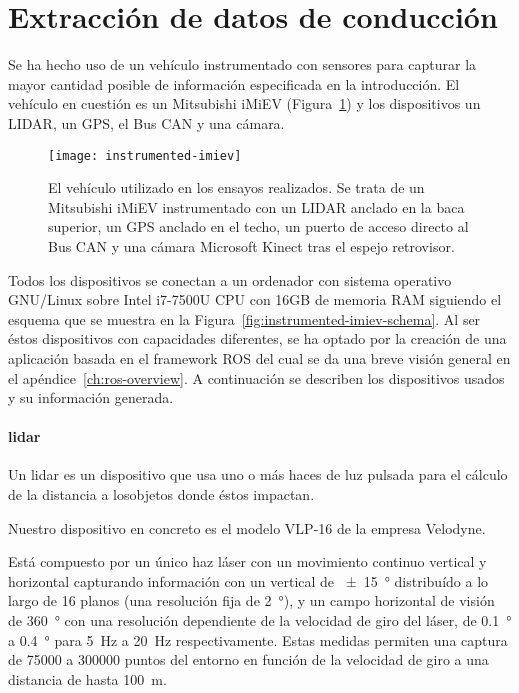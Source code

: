 \section{Extracción de datos de conducción}

Se ha hecho uso de un vehículo instrumentado con sensores para capturar la mayor cantidad posible de información especificada en la introducción. El vehículo en cuestión es un Mitsubishi iMiEV (Figura~\ref{fig:instrumented-imiev}) y los dispositivos un LIDAR, un GPS, el Bus CAN y una cámara.

\begin{figure}
	\texttt{[image: instrumented-imiev]}
	\caption{El vehículo utilizado en los ensayos realizados. Se trata de un Mitsubishi iMiEV instrumentado con un LIDAR anclado en la baca superior, un GPS anclado en el techo, un puerto de acceso directo al Bus CAN y una cámara Microsoft Kinect tras el espejo retrovisor.}
	\label{fig:instrumented-imiev}
\end{figure}

Todos los dispositivos se conectan a un ordenador con sistema operativo GNU/Linux sobre Intel i7-7500U CPU con 16GB de memoria RAM siguiendo el esquema que se muestra en la Figura~\ref{fig:instrumented-imiev-schema}. Al ser éstos dispositivos con capacidades diferentes, se ha optado por la creación de una aplicación basada en el framework ROS del cual se da una breve visión general en el apéndice~\ref{ch:ros-overview}. A continuación se describen los dispositivos usados y su información generada.

\paragraph{\ac{lidar}}

Un \ac{lidar} es un dispositivo que usa uno o más haces de luz pulsada para el cálculo de la distancia a losobjetos donde éstos impactan.

Nuestro dispositivo en concreto es el modelo VLP-16 de la empresa Velodyne.

Está compuesto por un único haz láser con un movimiento continuo vertical y horizontal capturando información con un vertical de \SI{\pm15}{\degree} distribuído a lo largo de 16 planos (una resolución fija de \SI{2}{\degree}), y un campo horizontal de visión de \SI{360}{\degree} con una resolución dependiente de la velocidad de giro del láser, de \SI{0.1}{\degree} a \SI{0.4}{\degree} para \SI{5}{\Hz} a \SI{20}{\Hz} respectivamente. Estas medidas permiten una captura de 75000 a 300000 puntos del entorno en función de la velocidad de giro a una distancia de hasta \SI{100}{\meter}.

